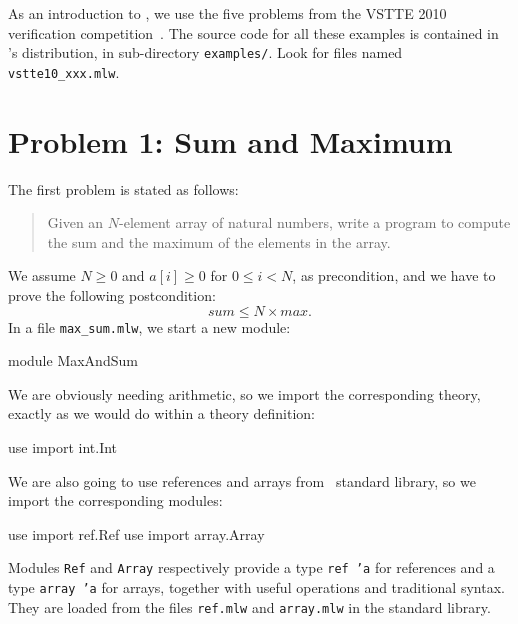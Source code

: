 \medskip
As an introduction to \whyml, we use the five problems from the VSTTE
2010 verification competition~\cite{vstte10comp}.
The source code for all these examples is contained in \why's
distribution, in sub-directory \texttt{examples/}. Look for files
named \texttt{vstte10\_xxx.mlw}.

\section{Problem 1: Sum and Maximum}
\label{sec:MaxAndSum}

The first problem is stated as follows:
\begin{quote}
  Given an $N$-element array of natural numbers,
  write a program to compute the sum and the maximum of the
  elements in the array.
\end{quote}
We  assume $N \ge 0$ and $a[i] \ge 0$ for $0 \le i < N$, as precondition,
and we have to prove the following postcondition:
\begin{displaymath}
  sum \le N \times max.
\end{displaymath}
In a file \verb|max_sum.mlw|, we start a new module:
\begin{whycode}
module MaxAndSum
\end{whycode}
We are obviously needing arithmetic, so we import the corresponding
theory, exactly as we would do within a theory definition:
\begin{whycode}
  use import int.Int
\end{whycode}
We are also going to use references and arrays from \why\ standard
library, so we import the corresponding modules:
\begin{whycode}
  use import ref.Ref
  use import array.Array
\end{whycode}
Modules \texttt{Ref} and \texttt{Array} respectively provide a type
\texttt{ref 'a} for references and a type \texttt{array 'a} for
arrays, together with useful
operations and traditional syntax. They are loaded from the \whyml
files \texttt{ref.mlw} and \texttt{array.mlw} in the standard library.

